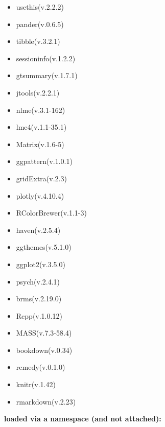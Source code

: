 \documentclass[
]{article}
\begin{document}
\begin{itemize}
\item
  usethis(v.2.2.2)
\item
  pander(v.0.6.5)
\item
  tibble(v.3.2.1)
\item
  sessioninfo(v.1.2.2)
\item
  gtsummary(v.1.7.1)
\item
  jtools(v.2.2.1)
\item
  nlme(v.3.1-162)
\item
  lme4(v.1.1-35.1)
\item
  Matrix(v.1.6-5)
\item
  ggpattern(v.1.0.1)
\item
  gridExtra(v.2.3)
\item
  plotly(v.4.10.4)
\item
  RColorBrewer(v.1.1-3)
\item
  haven(v.2.5.4)
\item
  ggthemes(v.5.1.0)
\item
  ggplot2(v.3.5.0)
\item
  psych(v.2.4.1)
\item
  brms(v.2.19.0)
\item
  Rcpp(v.1.0.12)
\item
  MASS(v.7.3-58.4)
\item
  bookdown(v.0.34)
\item
  remedy(v.0.1.0)
\item
  knitr(v.1.42)
\item
  rmarkdown(v.2.23)
\end{itemize}

\textbf{loaded via a namespace (and not attached):}
\end{document}
